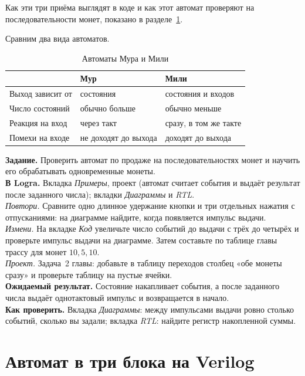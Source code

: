 Как эти три приёма выглядят в коде и как этот автомат проверяют на
последовательности монет, показано в разделе~\ref{sec:v-fsm3}.

Сравним два вида автоматов.

\begin{table}[H]
\centering
\caption{Автоматы Мура и Мили}
\small
\begin{tabularx}{\textwidth}{l X X}
\toprule
 & \textbf{Мур} & \textbf{Мили} \\
\midrule
Выход зависит от & состояния & состояния и входов \\
Число состояний & обычно больше & обычно меньше \\
Реакция на вход & через такт & сразу, в том же такте \\
Помехи на входе & не доходят до выхода & доходят до выхода \\
\bottomrule
\end{tabularx}
\end{table}

\begin{diybox}
\textbf{Задание.} Проверить автомат по продаже на последовательностях монет
и научить его обрабатывать одновременные монеты.\\
\textbf{В Logra.} Вкладка \emph{Примеры}, проект 
(автомат считает события и выдаёт результат после заданного числа);
вкладки \emph{Диаграммы} и \emph{RTL}.\\
 \emph{Повтори.} Сравните одно длинное удержание кнопки и три
отдельных нажатия с отпусканиями: на диаграмме найдите, когда появляется
импульс выдачи.\\
 \emph{Измени.} На вкладке \emph{Код} увеличьте число событий до
выдачи с трёх до четырёх и проверьте импульс выдачи на диаграмме. Затем
составьте по таблице главы трассу для монет $10, 5, 10$.\\
 \emph{Проект.} Задача~2 главы: добавьте в таблицу переходов столбец
«обе монеты сразу» и проверьте таблицу на пустые ячейки.\\
\textbf{Ожидаемый результат.} Состояние накапливает события, а после
заданного числа выдаёт однотактовый импульс и возвращается в начало.\\
\textbf{Как проверить.} Вкладка \emph{Диаграммы}: между импульсами выдачи
ровно столько событий, сколько вы задали; вкладка \emph{RTL}: найдите регистр
накопленной суммы.
\end{diybox}

\section{Автомат в три блока на Verilog}
\label{sec:v-fsm3}

